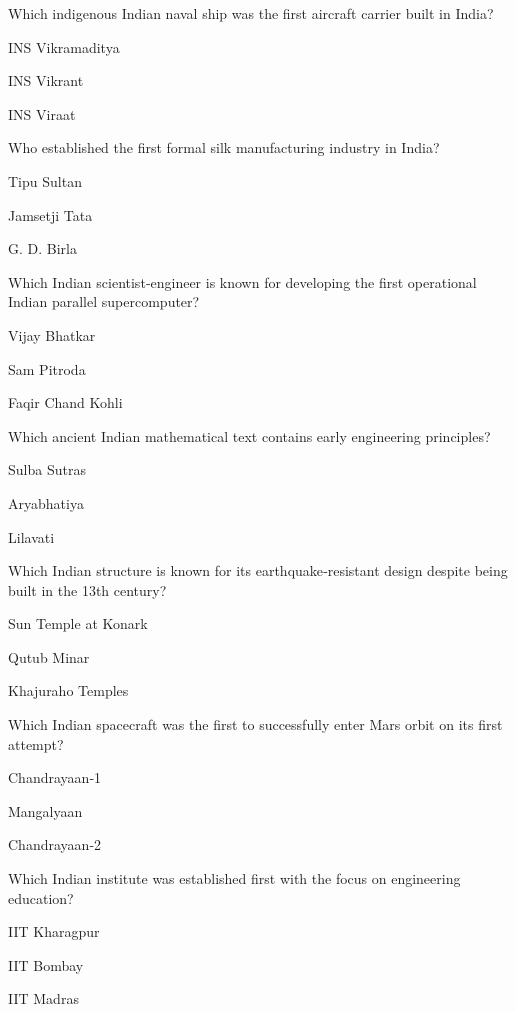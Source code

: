 \begin{enhancedmcq}{Which indigenous Indian naval ship was the first aircraft carrier built in India?}
\item INS Vikramaditya
\item INS Vikrant
\item INS Viraat

\end{enhancedmcq}
\begin{enhancedmcq}{Who established the first formal silk manufacturing industry in India?}
\item Tipu Sultan
\item Jamsetji Tata
\item G. D. Birla

\end{enhancedmcq}
\begin{enhancedmcq}{Which Indian scientist‑engineer is known for developing the first operational Indian parallel supercomputer?}
\item Vijay Bhatkar
\item Sam Pitroda
\item Faqir Chand Kohli

\end{enhancedmcq}
\begin{enhancedmcq}{Which ancient Indian mathematical text contains early engineering principles?}
\item Sulba Sutras
\item Aryabhatiya
\item Lilavati

\end{enhancedmcq}
\begin{enhancedmcq}{Which Indian structure is known for its earthquake‑resistant design despite being built in the 13th century?}
\item Sun Temple at Konark
\item Qutub Minar
\item Khajuraho Temples

\end{enhancedmcq}
\begin{enhancedmcq}{Which Indian spacecraft was the first to successfully enter Mars orbit on its first attempt?}
\item Chandrayaan‑1
\item Mangalyaan
\item Chandrayaan‑2

\end{enhancedmcq}
\begin{enhancedmcq}{Which Indian institute was established first with the focus on engineering education?}
\item IIT Kharagpur
\item IIT Bombay
\item IIT Madras

\end{enhancedmcq}
